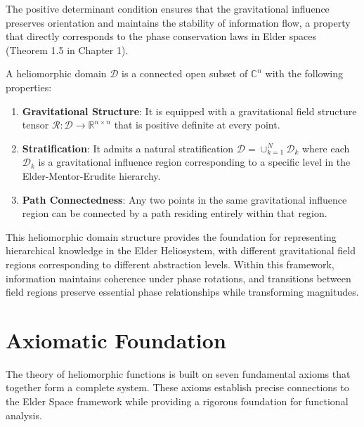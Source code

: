 

\begin{remark}
The positive determinant condition ensures that the gravitational influence preserves orientation and maintains the stability of information flow, a property that directly corresponds to the phase conservation laws in Elder spaces (Theorem 1.5 in Chapter 1).
\end{remark}

\begin{definition}
A heliomorphic domain $\mathcal{D}$ is a connected open subset of $\mathbb{C}^n$ with the following properties:
\begin{enumerate}
    \item \textbf{Gravitational Structure}: It is equipped with a gravitational field structure tensor $\mathcal{R}: \mathcal{D} \rightarrow \mathbb{R}^{n \times n}$ that is positive definite at every point.
    
    \item \textbf{Stratification}: It admits a natural stratification $\mathcal{D} = \cup_{k=1}^N \mathcal{D}_k$ where each $\mathcal{D}_k$ is a gravitational influence region corresponding to a specific level in the Elder-Mentor-Erudite hierarchy.
    
    \item \textbf{Path Connectedness}: Any two points in the same gravitational influence region can be connected by a path residing entirely within that region.
\end{enumerate}
\end{definition}

This heliomorphic domain structure provides the foundation for representing hierarchical knowledge in the Elder Heliosystem, with different gravitational field regions corresponding to different abstraction levels. Within this framework, information maintains coherence under phase rotations, and transitions between field regions preserve essential phase relationships while transforming magnitudes.

\section{Axiomatic Foundation}

The theory of heliomorphic functions is built on seven fundamental axioms that together form a complete system. These axioms establish precise connections to the Elder Space framework while providing a rigorous foundation for functional analysis.

